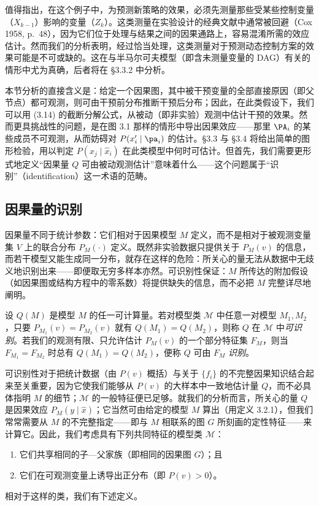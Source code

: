 值得指出，在这个例子中，为预测新策略的效果，必须先测量那些受某些控制变量（$X_{k-1}$）影响的变量（$Z_k$）。这类测量在实验设计的经典文献中通常被回避（Cox 1958, p.~48），因为它们位于处理与结果之间的因果通路上，容易混淆所需的效应估计。然而我们的分析表明，经过恰当处理，这类测量对于预测动态控制方案的效果可能是不可或缺的。这在与半马尔可夫模型（即含未测量变量的 DAG）有关的情形中尤为真确，后者将在 \S 3.3.2 中分析。

\begin{summarybox}
本节分析的直接含义是：给定一个因果图，其中被干预变量的全部直接原因（即父节点）都可观测，则可由干预前分布推断干预后分布；因此，在此类假设下，我们可以用 \textup{(3.14)} 的截断分解公式，从被动（即非实验）观测中估计干预的效果。然而更具挑战性的问题，是在图 3.1 那样的情形中导出因果效应——那里 $\PA_i$ 的某些成员不可观测，从而妨碍对 $P(x'_i\mid\pa_i)$ 的估计。\S 3.3 与 \S 3.4 将给出简单的图形检验，用以判定 $P(x_j\mid\hat{x}_i)$ 在此类模型中何时可估计。但首先，我们需要更形式地定义“因果量 $Q$ 可由被动观测估计”意味着什么——这个问题属于“识别”（identification）这一术语的范畴。
\end{summarybox}

\subsection{因果量的识别}

因果量不同于统计参数：它们相对于因果模型 $M$ 定义，而不是相对于被观测变量集 $V$ 上的联合分布 $P_M(\cdot)$ 定义。既然非实验数据只提供关于 $P_M(v)$ 的信息，而若干模型又能生成同一分布，就存在这样的危险：所关心的量无法从数据中无歧义地识别出来——即便取无穷多样本亦然。可识别性保证：$M$ 所传达的附加假设（如因果图或结构方程中的零系数）将提供缺失的信息，而不必把 $M$ 完整详尽地阐明。

\begin{definition}[可识别性]
设 $Q(M)$ 是模型 $M$ 的任一可计算量。若对模型类 $\mathcal{M}$ 中任意一对模型 $M_1,M_2$，只要 $P_{M_1}(v)=P_{M_2}(v)$ 就有 $Q(M_1)=Q(M_2)$，则称 $Q$ 在 $\mathcal{M}$ 中\emph{可识别}。若我们的观测有限、只允许估计 $P_M(v)$ 的一个部分特征集 $F_M$，则当 $F_{M_1}=F_{M_2}$ 时总有 $Q(M_1)=Q(M_2)$，便称 $Q$ 可由 $F_M$ \emph{识别}。
\end{definition}

可识别性对于把统计数据（由 $P(v)$ 概括）与关于 $\{f_i\}$ 的不完整因果知识结合起来至关重要，因为它使我们能够从 $P(v)$ 的大样本中一致地估计量 $Q$，而不必具体指明 $M$ 的细节；$\mathcal{M}$ 的一般特征便已足够。就我们的分析而言，所关心的量 $Q$ 是因果效应 $P_M(y\mid\hat{x})$；它当然可由给定的模型 $M$ 算出（用定义 3.2.1），但我们常常需要从 $M$ 的不完整指定——即与 $M$ 相联系的图 $G$ 所刻画的定性特征——来计算它。因此，我们考虑具有下列共同特征的模型类 $\mathcal{M}$：
\begin{enumerate}[label=(\roman*),leftmargin=2.2em]
\item 它们共享相同的子—父家族（即相同的因果图 $G$）；且
\item 它们在可观测变量上诱导出正分布（即 $P(v)>0$）。
\end{enumerate}
相对于这样的类，我们有下述定义。

